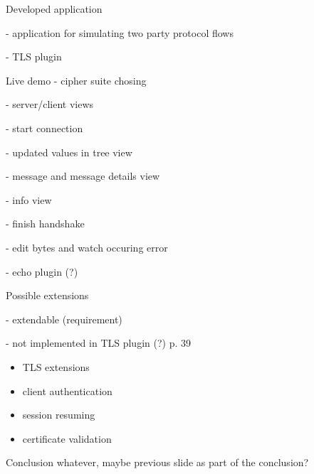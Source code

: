 
\begin{frame} {Developed application}

- application for simulating two party protocol flows

- TLS plugin

\end{frame}

\begin{frame} {Live demo}
- cipher suite chosing

- server/client views

- start connection 

- updated values in tree view

- message and message details view

- info view

- finish handshake

- edit bytes and watch occuring error

- echo plugin (?)

\end{frame}

\begin{frame} {Possible extensions}

- extendable (requirement)

- not implemented in TLS plugin (?) p. 39  

\begin{itemize}
	\item TLS extensions
	\item client authentication
	\item session resuming
	\item certificate validation
\end{itemize}

\end{frame}

\begin{frame}{Conclusion}
whatever, maybe previous slide as part of the conclusion?
\end{frame}

